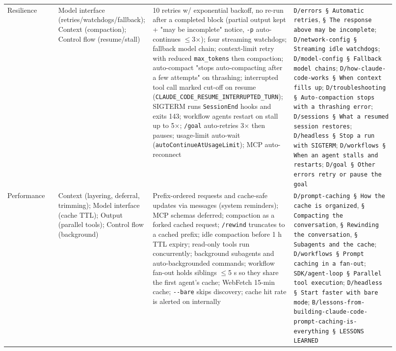 \begin{longtable}{@{}p{0.13\linewidth}p{0.17\linewidth}p{0.36\linewidth}p{0.26\linewidth}@{}}
Resilience & Model interface (retries/watchdogs/fallback); Context (compaction); Control flow (resume/stall) & 10 retries w/ exponential backoff, no re-run after a completed block (partial output kept + "may be incomplete" notice, \texttt{-\allowbreak{}p} auto-continues $\leq$3$\times$); four streaming watchdogs; fallback model chain; context-limit retry with reduced \texttt{max\_\allowbreak{}tokens} then compaction; auto-compact "stops auto-compacting after a few attempts" on thrashing; interrupted tool call marked cut-off on resume (\texttt{CLAUDE\_\allowbreak{}CODE\_\allowbreak{}RESUME\_\allowbreak{}INTERRUPTED\_\allowbreak{}TURN}); SIGTERM runs \texttt{SessionEnd} hooks and exits 143; workflow agents restart on stall up to 5$\times$; \texttt{/\allowbreak{}goal} auto-retries 3$\times$ then pauses; usage-limit auto-wait (\texttt{autoContinueAtUsageLimit}); MCP auto-reconnect & \texttt{D/\allowbreak{}errors § Automatic retries}, \texttt{§ The response above may be incomplete}; \texttt{D/\allowbreak{}network-\allowbreak{}config § Streaming idle watchdogs}; \texttt{D/\allowbreak{}model-\allowbreak{}config § Fallback model chains}; \texttt{D/\allowbreak{}how-\allowbreak{}claude-\allowbreak{}code-\allowbreak{}works § When context fills up}; \texttt{D/\allowbreak{}troubleshooting § Auto-\allowbreak{}compaction stops with a thrashing error}; \texttt{D/\allowbreak{}sessions § What a resumed session restores}; \texttt{D/\allowbreak{}headless § Stop a run with SIGTERM}; \texttt{D/\allowbreak{}workflows § When an agent stalls and restarts}; \texttt{D/\allowbreak{}goal § Other errors retry or pause the goal} \\
Performance & Context (layering, deferral, trimming); Model interface (cache TTL); Output (parallel tools); Control flow (background) & Prefix-ordered requests and cache-safe updates via messages (system reminders); MCP schemas deferred; compaction as a forked cached request; \texttt{/\allowbreak{}rewind} truncates to a cached prefix; idle compaction before 1 h TTL expiry; read-only tools run concurrently; background subagents and auto-backgrounded commands; workflow fan-out holds siblings $\leq$5 s so they share the first agent's cache; WebFetch 15-min cache; \texttt{-\allowbreak{}-\allowbreak{}bare} skips discovery; cache hit rate is alerted on internally & \texttt{D/\allowbreak{}prompt-\allowbreak{}caching § How the cache is organized}, \texttt{§ Compacting the conversation}, \texttt{§ Rewinding the conversation}, \texttt{§ Subagents and the cache}; \texttt{D/\allowbreak{}workflows § Prompt caching in a fan-\allowbreak{}out}; \texttt{SDK/\allowbreak{}agent-\allowbreak{}loop § Parallel tool execution}; \texttt{D/\allowbreak{}headless § Start faster with bare mode}; \texttt{B/\allowbreak{}lessons-\allowbreak{}from-\allowbreak{}building-\allowbreak{}claude-\allowbreak{}code-\allowbreak{}prompt-\allowbreak{}caching-\allowbreak{}is-\allowbreak{}everything § LESSONS LEARNED} \\

\end{longtable}
